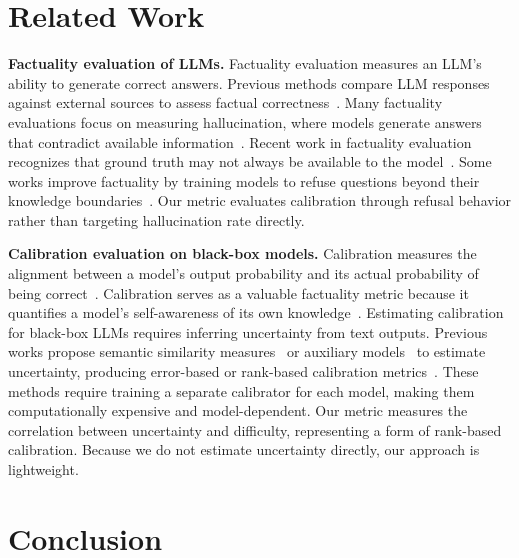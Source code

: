 \vspace{-0.7em}
\section{Related Work}
\vspace{-0.7em}
\label{sec:related_works}

\noindent\textbf{Factuality evaluation of LLMs.}
Factuality evaluation measures an LLM's ability to generate correct answers.
Previous methods compare LLM responses against external sources to assess factual correctness~\citep{wei2024measuringshortformfactualitylarge, min-etal-2023-factscore, kwiatkowski-etal-2019-natural}.
Many factuality evaluations focus on measuring hallucination, where models generate answers that contradict available information~\citep{bangHalluLensLLMHallucination2025}. Recent work in factuality evaluation recognizes that ground truth may not always be available to the model~\citep{jing2025factuality}.
Some works improve factuality by training models to refuse questions beyond their knowledge boundaries~\citep{cao2024learn, xu2024reliability, ouyang-etal-2022-training}.
Our metric evaluates calibration through refusal behavior rather than targeting hallucination rate directly.

\noindent\textbf{Calibration evaluation on black-box models.}
Calibration measures the alignment between a model's output probability and its actual probability of being correct~\citep{guo2017calibration}. Calibration serves as a valuable factuality metric because it quantifies a model's self-awareness of its own knowledge~\citep{kadavath2022mostly, yin-etal-2023-selfaware, agrawal2023hallucinating}. 
Estimating calibration for black-box LLMs requires inferring uncertainty from text outputs. Previous works propose semantic similarity measures~\citep{kuhn-etal-2023-semantic, farquhar-etal-2024-semantic} or auxiliary models~\citep{ulmer-etal-2024-calibrating} to estimate uncertainty, producing error-based or rank-based calibration metrics~\citep{huang-etal-2024-rank}. These methods require training a separate calibrator for each model, making them computationally expensive and model-dependent.
Our metric measures the correlation between uncertainty and difficulty, representing a form of rank-based calibration. Because we do not estimate uncertainty directly, our approach is lightweight.

\vspace{-0.7em}
\section{Conclusion}
\vspace{-0.7em}

